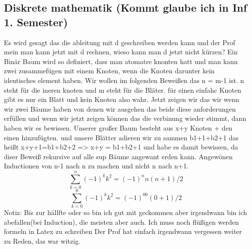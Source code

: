 \documentclass{article}
\begin{document}
\subsection{Diskrete mathematik (Kommt glaube ich in Inf 1. Semester)}
Es wird gesagt das die ableitung mit d geschreiben werden kann und der Prof mein man kann jetzt mit d rechnen, wieso kann man d jetzt nicht kürzen?
Ein Binär Baum wird so definiert, dass man atomatre knonten hatt und man kann zwei zusammefügen mit einem Knoten, wenn die Knoten darunter kein identisches element haben.
Wir wollen im folgenden Beweißen das n = m-1 ist. n steht für die ineren knoten und m steht für die Bläter. für einen einfahc Knoten gibt es nur ein Blatt und kein Knoten also wahr.
Jetzt zeigen wir das wir wenn wir zwei Bäume haben von denen wir ausgehen das beide diese anforderungen erfüllen und wenn wir jetzt zeigen können das die verbinung wieder stimmt,
dann haben wir es bewissen. Unserer großer Baum besteht aus x+y Knoten + den einen hinzufügten. und unsere Blätter adieren wir zu sammen b1+1+b2+1 das heißt x+y+1=b1+b2+2 => x+y = b1+b2+1
und habe es damit bewissen, da diser Beweiß rekursive auf alle sup Bäume angewant erden kann. Angewönen Inductionen von n-1 nach n zu machen und nicht n nach n+1.
\[
  \sum_{k=0}^{n}(-1)^kk^2 = (-1)^nn(n+1)/2
\]
\[
  \sum_{k=0}^{0}(-1)^kk^2 = (-1)^00(0+1)/2
\]
Notiz: Bis zur hällfte oder so bin ich gut mit geckommen aber irgendwann bin ich abefallen(bei Induction), die meisten aber auch.
Ich muss noch flüßigen werden formeln in Latex zu schreiben \break
Der Prof hat einfach irgendwann vergessen weiter zu Reden, das war witzig. \break
\end{document}
